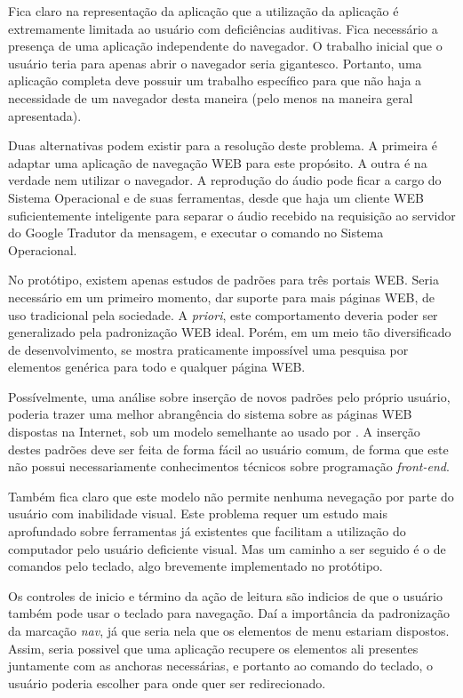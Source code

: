 \documentclass[
	12pt,				%
	oneside,			%
	a4paper,			%
	english,			%
	brazil				%
	]{abntex2ppgsi}
\begin{document}
Fica claro na representação da aplicação que a utilização da aplicação é extremamente limitada ao usuário com deficiências auditivas. Fica necessário a presença de uma aplicação independente do navegador. O trabalho inicial que o usuário teria para apenas abrir o navegador seria gigantesco. Portanto, uma aplicação completa deve possuir um trabalho específico para que não haja a necessidade de um navegador desta maneira (pelo menos na maneira geral apresentada). 

Duas alternativas podem existir para a resolução deste problema. A primeira é adaptar uma aplicação de navegação WEB para este propósito. A outra é na verdade nem utilizar o navegador. A reprodução do áudio pode ficar a cargo do Sistema Operacional e de suas ferramentas, desde que haja um cliente WEB suficientemente inteligente para separar o áudio recebido na requisição ao servidor do Google Tradutor da mensagem, e executar o comando no Sistema Operacional.

No protótipo, existem apenas estudos de padrões para três portais WEB. Seria necessário em um primeiro momento, dar suporte para mais páginas WEB, de uso tradicional pela sociedade. A \textit{priori}, este comportamento deveria poder ser generalizado pela padronização WEB ideal. Porém, em um meio tão diversificado de desenvolvimento, se mostra praticamente impossível uma pesquisa por elementos genérica para todo e qualquer página WEB. 

Possívelmente, uma análise sobre inserção de novos padrões pelo próprio usuário, poderia trazer uma melhor abrangência do sistema sobre as páginas WEB dispostas na Internet, sob um modelo semelhante ao usado por . A inserção destes padrões deve ser feita de forma fácil ao usuário comum, de forma que este não possui necessariamente conhecimentos técnicos sobre programação \textit{front-end}.

Também fica claro que este modelo não permite nenhuma nevegação por parte do usuário com inabilidade visual. Este problema requer um estudo mais aprofundado sobre ferramentas já existentes que facilitam a utilização do computador pelo usuário deficiente visual. Mas um caminho a ser seguido é o de comandos pelo teclado, algo brevemente implementado no protótipo.

Os controles de inicio e término da ação de leitura são indicios de que o usuário também pode usar o teclado para navegação. Daí a importância da padronização da marcação \textit{nav}, já que seria nela que os elementos de menu estariam dispostos. Assim, seria possivel que uma aplicação recupere os elementos ali presentes juntamente com as anchoras necessárias, e portanto ao comando do teclado, o usuário poderia escolher para onde quer ser redirecionado. 
\end{document}
